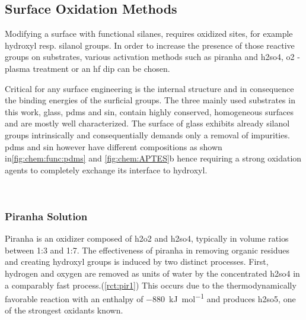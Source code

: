 \subsection{Surface Oxidation Methods}
Modifying a surface with functional silanes, requires oxidized sites, for example \gls{hydroxyl} resp. \gls{silanol} groups. In order to increase the presence of those reactive groups on substrates, various activation methods such as \gls{piranha} and \gls{h2so4}, \gls{o2} - plasma treatment or an \gls{hf} dip can be chosen.\cite{lit:chem:sin:etchingandchemical} 

Critical for any surface engineering is the internal structure and in consequence the binding energies of the surficial groups. The three mainly used substrates in this work, glass, \gls{pdms} and \gls{sin}, contain highly conserved, homogeneous surfaces and are mostly well characterized.\cite{lit:chem:3dfunc,lit:chem:sin:selectivemod,lit:chem:sin:APTES_proteinimmo} The surface of glass exhibits already \gls{silanol} groups intrinsically and consequentially demands only a removal of impurities. \gls{pdms} and \gls{sin} however have different compositions as shown in\cref{fig:chem:func:pdms} and \cref{fig:chem:APTES}b hence requiring a strong oxidation agents to completely exchange its interface to \gls{hydroxyl}.\cite{lit:chem:binding:sin, lit:chem:binding:pdms, lit:chem:surface:pdms}
\begin{figure}[h!]
	\centering
	\\
	\vspace{\baselineskip}
	\label{fig:chem:func:substrate}
\end{figure}

\subsubsection{Piranha Solution}
Piranha is an oxidizer composed of \gls{h2o2} and \gls{h2so4}, typically in volume ratios between 1:3 and 1:7. The effectiveness of piranha in removing organic residues and creating \gls{hydroxyl} groups is induced by two distinct processes. First, hydrogen and oxygen are removed as units of water by the concentrated \gls{h2so4} in a comparably fast process.(\cref{rct:pir1}) This occurs due to the thermodynamically favorable reaction with an enthalpy of \SI{-880}{\kilo\joule\per\mole} and produces \gls{h2so5}, one of the strongest oxidants known.\cite{lit:chem:piranha}

